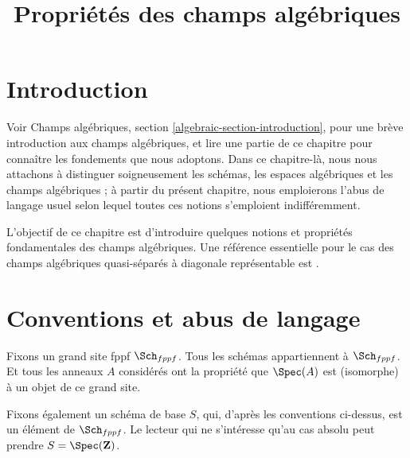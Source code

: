

%


\title{Propriétés des champs algébriques}


\maketitle

\label{section-phantom}

\tableofcontents

\section{Introduction}
\label{section-introduction}

\noindent
Voir
Champs algébriques, section \ref{algebraic-section-introduction},
pour une brève introduction aux champs algébriques, et lire
une partie de ce chapitre pour connaître les fondements que nous adoptons.
Dans ce chapitre-là, nous nous attachons à distinguer soigneusement
les schémas, les espaces algébriques et les champs algébriques ; à partir
du présent chapitre, nous emploierons l'abus de langage usuel selon lequel
toutes ces notions s'emploient indifféremment.

\medskip\noindent
L'objectif de ce chapitre est d'introduire quelques notions et
propriétés fondamentales des champs algébriques. Une référence
essentielle pour le cas des champs algébriques quasi-séparés à diagonale
représentable est \cite{LM-B}.



\section{Conventions et abus de langage}
\label{section-conventions}

\noindent
Fixons un grand site fppf $\Sch_{fppf}$.
Tous les schémas appartiennent à $\Sch_{fppf}$.
Et tous les anneaux $A$ considérés ont la propriété que
$\Spec(A)$ est (isomorphe) à un objet de ce grand site.

\medskip\noindent
Fixons également un schéma de base $S$, qui, d'après les conventions ci-dessus, est un élément
de $\Sch_{fppf}$. Le lecteur qui ne s'intéresse qu'au
cas absolu peut prendre $S = \Spec(\mathbf{Z})$.

